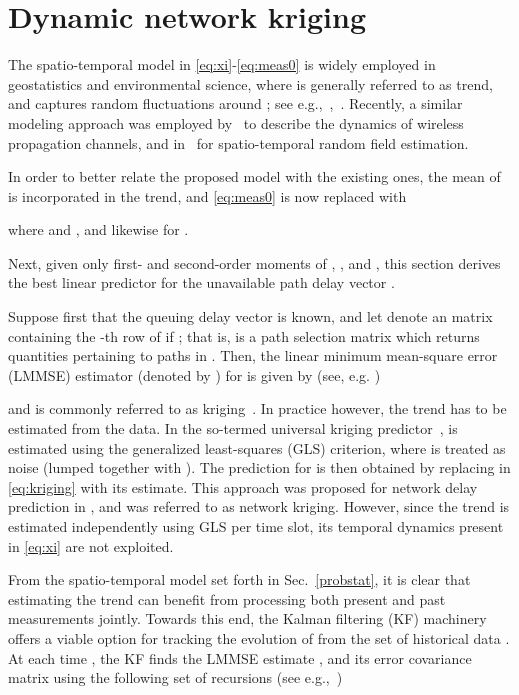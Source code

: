 \documentclass[draftcls,onecolumn,12pt]{IEEEtran}
\theoremstyle{plain}\newtheorem{thm}{Theorem}
\theoremstyle{definition}
\theoremstyle{remark}
\begin{document}
\section{Dynamic network kriging} \label{kriging}
The spatio-temporal model in \eqref{eq:xi}-\eqref{eq:meas0} is widely employed in geostatistics and environmental science, where  is generally referred to as trend, and  captures random fluctuations around ; see e.g.,~\cite[Ch.~4]{Rip81},~\cite{MGRA98,WiC99}. 
Recently, a similar modeling approach was employed by~\cite{kim} to describe the dynamics of wireless propagation channels, and in~\cite{Cor09} for spatio-temporal random field estimation. 
{ In order to better relate the proposed model with the existing ones, the mean of  is incorporated in the trend, and \eqref{eq:meas0} is now replaced with

where  and , and likewise for .}
Next, given only first- and second-order moments of , , and , this section derives the best linear predictor for the unavailable path delay vector .

 

Suppose first that the queuing delay vector  is known, and let  denote an  matrix containing the -th row of  if ; that is,  is a path selection matrix which returns quantities pertaining to paths in .
Then, the linear minimum mean-square error (LMMSE) estimator (denoted by ) for  is given by (see, e.g. \cite{AnM79})

and is commonly referred to as kriging~\cite{Cressie}. 
In practice however, the trend  has to be estimated from the data. 
In the so-termed universal kriging predictor~\cite{Rip81},  is estimated using the generalized least-squares (GLS) criterion, where  is treated as noise (lumped together with ). The prediction for  is then obtained by replacing  in \eqref{eq:kriging} with its estimate. This approach was proposed for network delay prediction in \cite{nk}, and was referred to as network kriging. 
However, since the trend is estimated independently using GLS per time slot, its temporal dynamics present in \eqref{eq:xi} are not exploited. 

From the spatio-temporal model set forth in Sec.~\ref{probstat}, it is clear that estimating the trend  can benefit from processing both present and past measurements jointly. 
Towards this end, the Kalman filtering (KF) machinery offers a viable option for tracking the evolution of  from the set of historical data . 
At each time , the KF finds the LMMSE estimate , and its error covariance matrix  using the following set of recursions (see e.g.,~\cite[Ch.~3]{AnM79})
\end{document}
